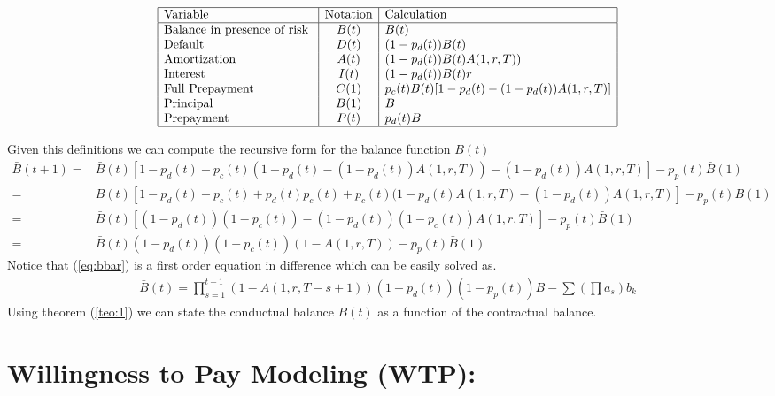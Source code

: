 \documentclass[12pt]{book}
\begin{document}
\begin{center} %
\[ %
\begin{array}{|l|c|l|} \hline %
\mbox{Variable} &\mbox{Notation} & \mbox{Calculation}\\ \hline
\mbox{Balance in presence of risk }  & B(t)  & B(t)\\
\mbox{Default  }  & D(t) & (1-p_d(t)) B(t)\\
\mbox{Amortization}  & A(t) &(1-p_d(t)) B(t)A(1,r,T))\\
\mbox{Interest }  &  I(t) & (1-p_d(t))B(t)r\\
\mbox{Full Prepayment}  & C(1) & p_c(t) B(t)[1-p_d(t)-(1-p_d(t))A(1,r,T)]\\
\mbox{Principal   }  &  B(1) & B\\
\mbox{Prepayment  }  & P(t) & p_d(t)B\\
\hline
\end{array} %
\] %
\end{center}

  Given this definitions we can compute the recursive form for the balance function $B(t)$
\begin{align}
\scriptstyle
     \bar{B}(t+1) =&\scriptstyle \bar{B}(t)[1-p_d(t)-p_c(t)(1-p_d(t)-(1-p_d(t))A(1,r,T))-(1-p_d(t))A(1,r,T) ]-p_p(t) \bar{B}(1) \nonumber\\
    =&\scriptstyle \bar{B}(t)[1-p_d(t)-p_c(t)+p_d(t)p_c(t)+p_c(t)(1-p_d(t)A(1,r,T)-(1-p_d(t))A(1,r,T)]
    -p_p(t) \bar{B}(1) \nonumber\\
    =&\scriptstyle
    \bar{B}(t)[ (1-p_d(t))(1-p_c(t))-(1-p_d(t))(1-p_c(t))A(1,r,T)]
    -p_p(t) \bar{B}(1) \nonumber\\
     =&\scriptstyle
    \bar{B}(t)(1-p_d(t))(1-p_c(t))(1-A(1,r,T))
    -p_p(t) \bar{B}(1) \label{eq:bbar}\
\end{align}
Notice that (\ref{eq:bbar}) is a first order equation in difference which can be easily solved as.
\begin{align}
    \bar{B}(t) =\prod^{t-1}_{s=1} (1-A(1,r,T-s+1))(1-p_d(t))(1-p_p(t))B-\sum (\prod a_s) b_k
\end{align}
Using theorem (\ref{teo:1}) we can state the conductual balance $B(t)$ as a function of the contractual balance.



\chapter{Willingness to Pay Modeling (WTP): }
\end{document}
